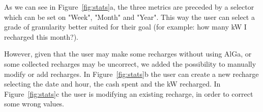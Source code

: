 As we can see in Figure~\ref{fig:stats}a, the three metrics are preceded by a selector which can be set on "Week", "Month" and "Year". This way the user can select a grade of granularity better suited for their goal (for example: how many kW I recharged this month?). 

However, given that the user may make some recharges without using AlGa, or some collected recharges may be uncorrect, we added the possibility to manually modify or add recharges. In Figure~\ref{fig:stats}b the user can create a new recharge selecting the date and hour, the cash spent and the kW recharged. In Figure~\ref{fig:stats}c the user is modifying an existing recharge, in order to correct some wrong values.

\begin{figure}[H]
    \centering
    \quad
    \quad

\end{figure}
